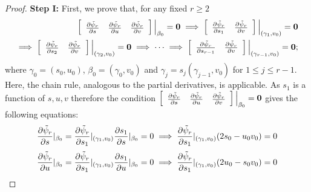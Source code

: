 \documentclass[10pt,twoside]{amsart}
\theoremstyle{definition}
\theoremstyle{definition}
\begin{document}
\begin{proof} 
\textbf{Step I:}
First, we prove that, for any fixed $r\geq 2$
\begin{eqnarray*}
\left[\begin{array}{ccc}
    \frac{\partial\Tilde{\psi}_r}{\partial s} & \frac{\partial\Tilde{\psi}_r}{\partial u} & \frac{\partial\Tilde{\psi}_r}{\partial v}  \end{array}\right]\Big |_{\beta_0}=\mathbf{0}\implies \left[\begin{array}{ccc}\frac{\partial\Tilde{\psi}_r}{\partial s_1} & \frac{\partial\Tilde{\psi}_r}{\partial v}  \end{array}\right]\Big |_{(\gamma_1,v_0)}=\mathbf{0} \\\implies \left[\begin{array}{ccc}
    \frac{\partial\Tilde{\psi}_r}{\partial s_2} & \frac{\partial\Tilde{\psi}_r}{\partial v}  \end{array}\right]\Big |_{(\gamma_2,v_0)}=\mathbf{0}\implies\cdots\implies \left[\begin{array}{ccc}
    \frac{\partial\Tilde{\psi}_r}{\partial s_{r-1}} & \frac{\partial\Tilde{\psi}_r}{\partial v}  \end{array}\right]\Big |_{(\gamma_{r-1},v_0)}=\mathbf{0} ; 
    \end{eqnarray*}
where $\gamma_0=(s_0,u_0)$, $\beta_0=(\gamma_0,v_0)$ and $\gamma_j=s_j(\gamma_{j-1},v_0)$ for $1\leq j\leq r-1$. Here, the chain rule, analogous to the partial derivatives, is applicable. As $s_1$ is a function of $s,u,v$ therefore the condition $\left[\begin{array}{cccccccc}
  \frac{\partial\Tilde{\psi}_r}{\partial s} & \frac{\partial\Tilde{\psi}_r}{\partial u} & \frac{\partial\Tilde{\psi}_r}{\partial v}\end{array}\right]\Big|_{\beta_0}=\mathbf{0}$ gives the following equations:
\begin{equation}{\label{lemsimp i}}
\frac{\partial\Tilde{\psi}_r}{\partial s}|_{\beta_0}=\frac{\partial\Tilde{\psi}_r}{\partial s_1}|_{(\gamma_1,v_0)}\frac{\partial s_1}{\partial s}|_{\beta_0}=0\implies \frac{\partial\Tilde{\psi}_r}{\partial s_1}|_{(\gamma_1,v_0)}(2s_0-u_0v_0)=0 \end{equation}
 \begin{equation}{\label{lemsimp ii}}
   \frac{\partial\Tilde{\psi}_r}{\partial u}|_{\beta_0}=\frac{\partial\Tilde{\psi}_r}{\partial s_1}|_{(\gamma_1,v_0)}\frac{\partial s_1}{\partial u}|_{\beta_0}=0\implies \frac{\partial\Tilde{\psi}_r}{\partial s_1}|_{(\gamma_1,v_0)}(2u_0-s_0v_0)=0 

\end{equation}
\end{proof}
\end{document}
